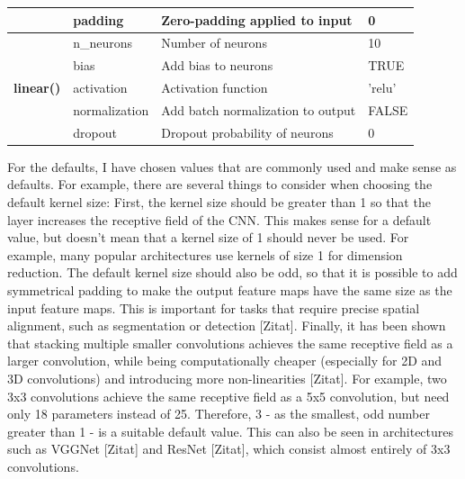 \documentclass[12pt,twoside]{scrreport}
\begin{document}
\begin{table}[t]
{\begin{tabular}{|llll|}
			& padding       & Zero-padding applied to input                                     & 0         \\
			\hline
			\multirow{5}{*}{\textbf{linear()}}   & n\_neurons    & Number of neurons                                                                                              & 10        \\
			& bias          & Add bias to neurons                                                              & TRUE      \\
			& activation    & Activation function                                                      & 'relu'    \\
			& normalization & Add batch normalization to output                                                      & FALSE     \\
			& dropout       & Dropout probability of neurons                                          & 0         \\ \hline
		\end{tabular}
	}

	\label{layers}
\end{table}

For the defaults, I have chosen values that are commonly used and make sense as defaults. For example, there are several things to consider when choosing the default kernel size: First, the kernel size should be greater than 1 so that the layer increases the receptive field of the CNN. This makes sense for a default value, but doesn't mean that a kernel size of 1 should never be used. For example, many popular architectures use kernels of size 1 for dimension reduction. The default kernel size should also be odd, so that it is possible to add symmetrical padding to make the output feature maps have the same size as the input feature maps. This is important for tasks that require precise spatial alignment, such as segmentation or detection [Zitat]. Finally, it has been shown that stacking multiple smaller convolutions achieves the same receptive field as a larger convolution, while being computationally cheaper (especially for 2D and 3D convolutions) and introducing more non-linearities [Zitat]. For example, two 3x3 convolutions achieve the same receptive field as a 5x5 convolution, but need only 18 parameters instead of 25. Therefore, 3 - as the smallest, odd number greater than 1 - is a suitable default value. This can also be seen in architectures such as VGGNet [Zitat] and ResNet [Zitat], which consist almost entirely of 3x3 convolutions.
\end{document}
